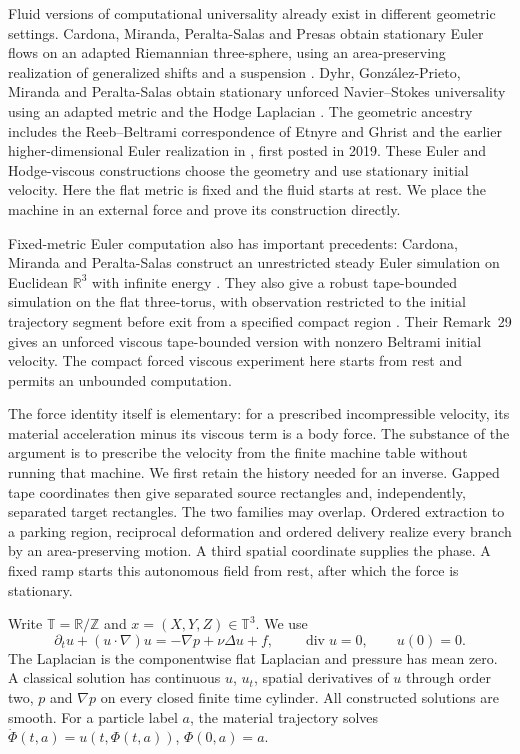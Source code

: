 \documentclass[11pt]{article}
\theoremstyle{remark}\newtheorem{remark}[theorem]{Remark}
\newcommand{\T}{\mathbb T}\newcommand{\R}{\mathbb R}
\newcommand{\Z}{\mathbb Z}\newcommand{\N}{\mathbb N}
\DeclareMathOperator{\diver}{div}
\begin{document}
Fluid versions of computational universality already exist in different
geometric settings. Cardona, Miranda, Peralta-Salas and Presas obtain
stationary Euler flows on an adapted Riemannian three-sphere, using an
area-preserving realization of generalized shifts and a suspension
\cite{CardonaMirandaPeraltaSalasPresas2021}. Dyhr, Gonz\'alez-Prieto, Miranda and Peralta-Salas
obtain stationary unforced Navier--Stokes universality using an adapted
metric and the Hodge Laplacian \cite{DyhrGonzalezPrietoMirandaPeraltaSalas2026}. The geometric ancestry includes the Reeb--Beltrami correspondence
of Etnyre and Ghrist \cite{EtnyreGhrist2000} and the earlier
higher-dimensional Euler realization in
\cite{CardonaMirandaPeraltaSalasPresas2023}, first posted in 2019.
These Euler and Hodge-viscous constructions choose the geometry and
use stationary initial velocity. Here the flat metric is fixed and the
fluid starts at rest. We place the machine in an external force and
prove its construction directly.

Fixed-metric Euler computation also has
important precedents: Cardona, Miranda and Peralta-Salas construct an
unrestricted steady Euler simulation on Euclidean $\R^3$ with infinite
energy \cite[arXiv version~3, Theorem~1]{CardonaMirandaPeraltaSalas2023Beltrami}.
They also give a robust tape-bounded simulation on the flat three-torus,
with observation restricted to the initial trajectory segment before
exit from a specified compact region
\cite[arXiv version~3, Theorem~26]{CardonaMirandaPeraltaSalas2023Beltrami}.
Their Remark~29 gives an unforced viscous tape-bounded version with
nonzero Beltrami initial velocity. The compact forced viscous experiment
here starts from rest and permits an unbounded computation.

The force identity itself is elementary: for a prescribed incompressible
velocity, its material acceleration minus its viscous term is a body
force. The substance of the argument is to prescribe the velocity from
the finite machine table without running that machine. We first retain
the history needed for an inverse. Gapped tape coordinates then give
separated source rectangles and, independently, separated target
rectangles. The two families may overlap. Ordered extraction to a
parking region, reciprocal deformation and ordered delivery realize
every branch by an area-preserving motion. A third spatial coordinate
supplies the phase. A fixed ramp starts this autonomous field from rest,
after which the force is stationary.

Write $\T=\R/\Z$ and $x=(X,Y,Z)\in\T^3$. We use
\begin{equation}\label{eq:NS}
 \partial_tu+(u\cdot\nabla)u=-\nabla p+\nu\Delta u+f,
 \qquad \diver u=0,\qquad u(0)=0.
\end{equation}
The Laplacian is the componentwise flat Laplacian and pressure has mean
zero. A classical solution has continuous $u$, $u_t$, spatial derivatives
of $u$ through order two, $p$ and $\nabla p$ on every closed finite
time cylinder. All constructed solutions are smooth. For a particle
label $a$, the material trajectory solves
$\dot\Phi(t,a)=u(t,\Phi(t,a))$, $\Phi(0,a)=a$.
\end{document}
